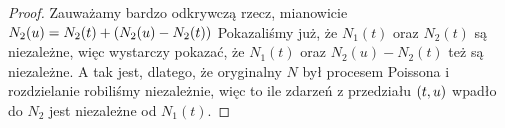 \begin{proof}
    Zauważamy bardzo odkrywczą rzecz, mianowicie \( N_2(u) = N_2(t) + \left(N_2(u) - N_2(t)\right) \)
    Pokazaliśmy już, że \( N_1(t) \) oraz \( N_2(t) \) są niezależne, więc wystarczy pokazać, że 
    \( N_1(t) \) oraz \(N_2(u) - N_2(t)\) też są niezależne.
    A tak jest, dlatego, że oryginalny \( N \) był procesem Poissona i rozdzielanie robiliśmy niezależnie, więc to ile zdarzeń z przedziału \( \left(t, u\right) \) wpadło do \( N_2 \) jest niezależne od \( N_1(t) \).
\end{proof}
